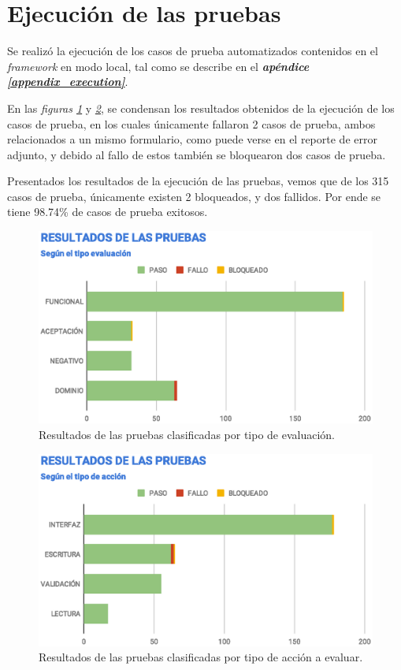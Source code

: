 \section{Ejecución de las pruebas}
Se realizó la ejecución de los casos de prueba automatizados contenidos en el
\emph{framework} en modo local, tal como se describe en el
\emph{\textbf{apéndice \ref{appendix_execution}}}.

En las \emph{figuras \ref{results-tests}} y \emph{\ref{results-type}}, se
condensan los resultados obtenidos de la ejecución de los casos de prueba, en
los cuales únicamente fallaron 2 casos de prueba, ambos relacionados a un mismo
formulario, como puede verse en el reporte de error adjunto, y debido al fallo
de estos también se bloquearon dos casos de prueba.

Presentados los resultados de la ejecución de las pruebas, vemos que de los 315
casos de prueba, únicamente existen 2 bloqueados, y dos fallidos. Por ende se
tiene 98.74\% de casos de prueba exitosos.

\begin{figure}
\centering
\includegraphics[width=1.0\textwidth]{graphics/results-tests.eps}
\caption{Resultados de las pruebas clasificadas por tipo de evaluación.}
\label{results-tests}
\end{figure}

\begin{figure}
\centering
\includegraphics[width=1.0\textwidth]{graphics/results-type.eps}
\caption{Resultados de las pruebas clasificadas por tipo de acción a evaluar.}
\label{results-type}
\end{figure}

